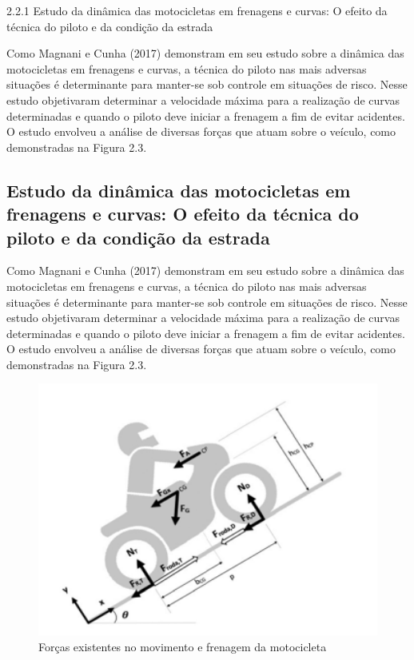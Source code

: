 2.2.1 Estudo da dinâmica das motocicletas em frenagens e curvas: O efeito da técnica do piloto e da condição da estrada

Como Magnani e Cunha (2017) demonstram em seu estudo sobre a dinâmica das motocicletas em frenagens e curvas, a técnica do piloto nas mais adversas situações é determinante para manter-se sob controle em situações de risco. Nesse estudo objetivaram determinar a velocidade máxima para a realização de curvas determinadas e quando o piloto deve iniciar a frenagem a fim de evitar acidentes. 
O estudo envolveu a análise de diversas forças que atuam sobre o veículo, como demonstradas na Figura 2.3.


\subsection{Estudo da dinâmica das motocicletas em frenagens e curvas: O efeito da técnica do piloto e da condição da estrada}

Como Magnani e Cunha (2017) demonstram em seu estudo sobre a dinâmica das motocicletas em frenagens e curvas, a técnica do piloto nas mais adversas situações é determinante para manter-se sob controle em situações de risco. Nesse estudo objetivaram determinar a velocidade máxima para a realização de curvas determinadas e quando o piloto deve iniciar a frenagem a fim de evitar acidentes. 
O estudo envolveu a análise de diversas forças que atuam sobre o veículo, como demonstradas na Figura 2.3.
    
\begin{figure}[H]

 \caption{Forças existentes no movimento e frenagem da motocicleta}
 \centering
  \includegraphics[width=150mm]{images/Cap2/forca.png}
  \end{figure}
  
